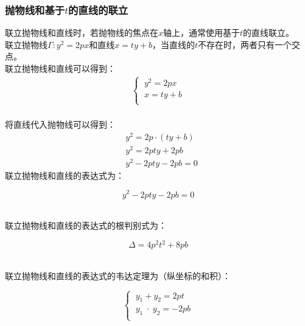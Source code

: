\documentclass[UTF8]{ctexart}
\begin{document}
\newpage

\subsubsection{抛物线和基于$t$的直线的联立}
    \setcounter{equation}{0}
    联立抛物线和直线时，若抛物线的焦点在$x$轴上，通常使用基于$t$的直线联立。\\[3mm]
    联立抛物线$\Gamma:y^2=2px$和直线$x=ty+b$，当直线的$t$不存在时，两者只有一个交点。\\[3mm]
    联立抛物线和直线可以得到：
    \begin{align}
        \begin{cases}
            ~y^2=2px\\[1mm]
            ~x=ty+b\\[1mm]
        \end{cases}
    \end{align}\\
    将直线代入抛物线可以得到：
    \begin{align}
        &y^2=2p\cdot(ty+b)\\[3mm]
        &y^2=2pty+2pb\\[3mm]
        &y^2-2pty-2pb=0
    \end{align}
    联立抛物线和直线的表达式为：
    \begin{large}
        \begin{equation*}
            y^2-2pty-2pb=0
        \end{equation*}
    \end{large}\\
    联立抛物线和直线的表达式的根判别式为：
    \begin{large}
        \begin{equation*}
            \Delta=4p^2t^2+8pb
        \end{equation*}
    \end{large}\\
    联立抛物线和直线的表达式的韦达定理为（纵坐标的和积）：\vspace{3pt}
    \begin{large}
        \begin{equation*}
            \begin{cases}
                ~y_1+y_2=2pt\\[1mm]
                ~y_1\hspace{3pt}\cdot\hspace{3pt}y_2=-2pb\\[1mm]
            \end{cases}
        \end{equation*}
    \end{large}\\[1mm]
\end{document}
